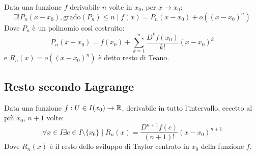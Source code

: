 \begin{teor}[di Taylor]
	\label{der:taylor}
	Data una funzione $f$ derivabile $n$ volte in $x_0$, per $x\to x_0$:
	\[
		\exists! P_n(x-x_0), \text{grado}(P_n)\leq n\mid f(x)=P_n(x-x_0)+o((x-x_0)^n)
	\]
	Dove $P_n$ è un polinomio così costruito:
	\[
		P_n(x-x_0)=f(x_0)+\sum_{k=1}^n \frac{D^kf(x_0)}{k!}(x-x_0)^k
	\]
	e $R_n(x)=o((x-x_0)^n)$ è detto resto di Teano.
\end{teor}


\subsection{Resto secondo Lagrange}
\begin{teor}
	\label{tay:restolagrange}
	Data una funzione $f:U\in I(x_0)\to\mathbb{R}$, derivabile in tutto l'intervallo, eccetto al più $x_0$, $n+1$ volte:
	\[
		\forall x\in I\exists c\in I\setminus\{x_0\}\mid R_n(x)=\frac{D^{n+1}f(c)}{(n+1)!}(x-x_0)^{n+1}
	\]
	Dove $R_n(x)$ è il resto dello sviluppo di Taylor centrato in $x_0$ della funzione $f$.
\end{teor}
